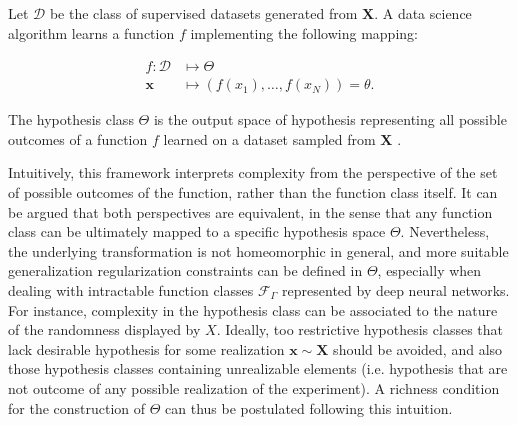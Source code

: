 


\begin{definition}\label{def:hypothesis_class}
    Let $\mathcal{D}$ be the class of supervised datasets generated from $\bm{X}$. 
    A data science algorithm learns a function $f$ implementing the following mapping:

    $$
    \begin{aligned}
        f: \mathcal{D} & \longmapsto \Theta \\
        \bm{x}  & \longmapsto (f(x_1), \dots, f(x_N)) = \theta.
    \end{aligned}
    $$

    The hypothesis class $\Theta$ is the output space of hypothesis representing all 
    possible outcomes of a function $f$ learned on a dataset sampled from $\bm{X}$
    \cite{buhmannDataScienceAlgorithms2022}.

\end{definition}

Intuitively, this framework interprets complexity from the perspective of the set of possible
outcomes of the function, rather than the function class itself. It can be argued
that both perspectives are equivalent, in the sense that any function class can be 
ultimately mapped to a specific hypothesis space $\Theta$. Nevertheless, the underlying transformation is not
homeomorphic in general, and more suitable generalization regularization
constraints can be defined in $\Theta$, especially when dealing with intractable
function classes $\mathcal{F}_{\Gamma}$ represented by deep neural networks. \\

For instance, complexity in the hypothesis class can be associated to the nature of the
randomness displayed by $X$. Ideally, too restrictive hypothesis classes that lack desirable
hypothesis for some realization $\bm{x} \sim \bm{X}$ should be avoided, and also those hypothesis
classes containing unrealizable elements (i.e. hypothesis that are not outcome of
any possible realization of the experiment). A richness condition for the construction of $\Theta$ 
can thus be postulated following this intuition. \\

